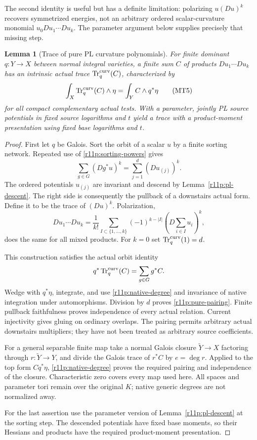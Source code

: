 \documentclass[11pt]{article}
\newtheorem{lemma}[theorem]{Lemma}
\theoremstyle{definition}
\theoremstyle{remark}
\numberwithin{equation}{section}
\begin{document}
The second identity is useful but has a definite limitation:
polarizing $u(Du)^k$ recovers symmetrized energies, not an arbitrary
ordered scalar-curvature monomial $u_0Du_1\cdots Du_k$.
The parameter argument below supplies precisely that missing step.

\begin{lemma}[Trace of pure PL curvature polynomials]
\label{r11p:pure-trace}
For finite dominant $q:Y\to X$ between normal integral varieties, a
finite sum $C$ of products $Du_1\cdots Du_k$ has an intrinsic actual
trace $\operatorname{Tr}^{\rm curv}_q(C)$, characterized by
\[
 \int_X\operatorname{Tr}^{\rm curv}_q(C)\wedge\eta
                         =\int_YC\wedge q^*\eta
\tag{MT5}\label{r11p:pure-pairing}
\]
for all compact complementary actual tests.  With a parameter, jointly
PL source potentials in fixed source logarithms and $t$ yield a trace
with a product-moment presentation using fixed base logarithms and $t$.
\end{lemma}

\begin{proof}
First let $q$ be Galois.  Sort the orbit of a scalar $u$ by a finite
sorting network.  Repeated use of \eqref{r11p:sorting-powers} gives
\[
                     \sum_{g\in G}(Dg^*u)^k
                            =\sum_{j=1}^d(Du_{(j)})^k.
\]
The ordered potentials $u_{(j)}$ are invariant and descend by
Lemma~\ref{r11p:pl-descent}.  The right side is consequently the
pullback of a downstairs actual form.  Define it to be the trace of
$(Du)^k$.  Polarization,
\[
 Du_1\cdots Du_k
   =\frac1{k!}\sum_{I\subset\{1,\ldots,k\}}
           (-1)^{k-|I|}\left(D\sum_{i\in I}u_i\right)^k,
\]
does the same for all mixed products.  For $k=0$ set
$\operatorname{Tr}^{\rm curv}_q(1)=d$.

This construction satisfies the actual orbit identity
\[
                 q^*\operatorname{Tr}^{\rm curv}_q(C)
                                      =\sum_{g\in G}g^*C.
\]
Wedge with $q^*\eta$, integrate, and use
\eqref{r11p:native-degree} and invariance of native integration under
automorphisms.  Division by $d$ proves \eqref{r11p:pure-pairing}.
Finite pullback faithfulness proves independence of every actual
relation.  Current injectivity gives gluing on ordinary overlaps.
The pairing permits arbitrary actual downstairs multipliers; they
have not been treated as arbitrary source coefficients.

For a general separable finite map take a normal Galois closure
$\widetilde Y\to X$ factoring through $r:\widetilde Y\to Y$, and divide
the Galois trace of $r^*C$ by $e=\deg r$.  Applied to the top form
$Cq^*\eta$, \eqref{r11p:native-degree} proves the required pairing and
independence of the closure.  Characteristic zero covers every map
used here.  All spaces and parameter tori remain over the original
$K$; native generic degrees are not normalized away.

For the last assertion use the parameter version of
Lemma~\ref{r11p:pl-descent} at the sorting step.  The descended
potentials have fixed base moments, so their Hessians and products
have the required product-moment presentation.
\end{proof}
\end{document}
